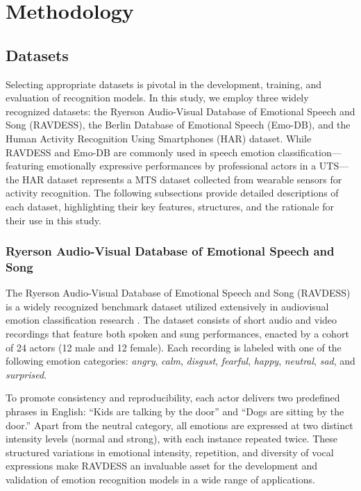 \chapter{Methodology} \label{chap:methodolo}

\section{Datasets}

Selecting appropriate datasets is pivotal in the development, training, and evaluation of recognition models. In this study, we employ three widely recognized datasets: the Ryerson Audio-Visual Database of Emotional Speech and Song (RAVDESS), the Berlin Database of Emotional Speech (Emo-DB), and the Human Activity Recognition Using Smartphones (HAR) dataset. While RAVDESS and Emo-DB are commonly used in speech emotion classification—featuring emotionally expressive performances by professional actors in a UTS—the HAR dataset represents a MTS dataset collected from wearable sensors for activity recognition. The following subsections provide detailed descriptions of each dataset, highlighting their key features, structures, and the rationale for their use in this study.

\subsection{Ryerson Audio-Visual Database of Emotional Speech and Song} %

The Ryerson Audio-Visual Database of Emotional Speech and Song (RAVDESS) \cite{ravdess} is a widely recognized benchmark dataset utilized extensively in audiovisual emotion classification research \cite{anusha2021, vimal2021, abdullah2020}. The dataset consists of short audio and video recordings that feature both spoken and sung performances, enacted by a cohort of 24 actors (12 male and 12 female). Each recording is labeled with one of the following emotion categories: \textit{angry}, \textit{calm}, \textit{disgust}, \textit{fearful}, \textit{happy}, \textit{neutral}, \textit{sad}, and \textit{surprised}.

To promote consistency and reproducibility, each actor delivers two predefined phrases in English: ``Kids are talking by the door'' and ``Dogs are sitting by the door.'' Apart from the neutral category, all emotions are expressed at two distinct intensity levels (normal and strong), with each instance repeated twice. These structured variations in emotional intensity, repetition, and diversity of vocal expressions make RAVDESS an invaluable asset for the development and validation of emotion recognition models in a wide range of applications.

